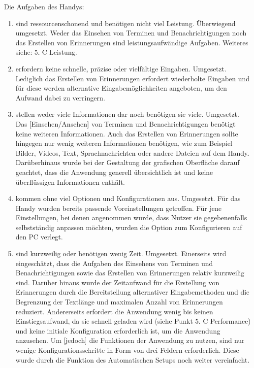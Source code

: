 \begin{enumerate}
\begin{enumerate}[label*={\arabic*}]
		\end{enumerate}
		\myNewSection%
		Die Aufgaben des Handys:%
		\begin{enumerate}[label*={\arabic*}]
			\item sind ressourcenschonend und benötigen nicht viel Leistung.\newline%
				Überwiegend umgesetzt. Weder das Einsehen von Terminen und Benachrichtigungen noch das Erstellen von Erinnerungen sind leistungsaufwändige Aufgaben. Weiteres siehe: 5. C Leistung.
			\item erfordern keine schnelle, präzise oder vielfältige Eingaben.\newline%
				Umgesetzt. Lediglich das Erstellen von Erinnerungen erfordert wiederholte Eingaben und für diese werden alternative Eingabemöglichkeiten angeboten, um den Aufwand dabei zu verringern. 
			\item stellen weder viele Informationen dar noch benötigen sie viele.\newline%
				Umgesetzt. Das [Einsehen/Ansehen] von Terminen und Benachrichtigungen benötigt keine weiteren Informationen. Auch das Erstellen von Erinnerungen sollte hingegen nur wenig weiteren Informationen benötigen, wie zum Beispiel Bilder, Videos, Text, Sprachnachrichten oder andere Dateien auf dem Handy. Darüberhinaus wurde bei der Gestaltung der grafischen Oberfläche darauf geachtet, dass die Anwendung generell übersichtlich ist und keine überflüssigen Informationen enthält.%
			\item kommen ohne viel Optionen und Konfigurationen aus.\newline%
				Umgesetzt. Für das Handy wurden bereits passende Voreinstellungen getroffen. Für jene Einstellungen, bei denen angenommen wurde, dass Nutzer sie gegebenenfalls selbstständig anpassen möchten, wurden die Option zum Konfigurieren auf den PC verlegt.
			\item sind kurzweilig oder benötigen wenig Zeit.\newline%
				Umgesetzt. Einerseits wird eingeschätzt, dass die Aufgaben des Einsehens von Terminen und Benachrichtigungen sowie das Erstellen von Erinnerungen relativ kurzweilig sind. Darüber hinaus wurde der Zeitaufwand für die Erstellung von Erinnerungen durch die Bereitstellung alternativer Eingabemethoden und die Begrenzung der Textlänge und maximalen Anzahl von Erinnerungen reduziert. Andererseits erfordert die Anwendung wenig bis keinen Einstiegsaufwand, da sie schnell geladen wird (siehe Punkt 5. C Performance) und keine initiale Konfiguration erforderlich ist, um die Anwendung anzusehen. Um [jedoch] die Funktionen der Anwendung zu nutzen, sind nur wenige Konfigurationsschritte in Form von drei Feldern erforderlich. Diese wurde durch die Funktion des \glqq Automatischen Setups\grqq{} noch weiter vereinfacht.

\end{enumerate}
\end{enumerate}
